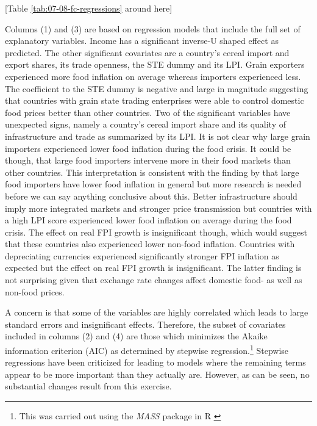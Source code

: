 \documentclass[12pt,english]{article}
\begin{document}
\begin{center}
[Table \ref{tab:07-08-fc-regressions} around here]
\par\end{center}

Columns (1) and (3) are based on regression models that include the full set of explanatory variables. Income has a significant inverse-U shaped effect as predicted. The other significant covariates are a country's cereal import and export shares, its trade openness, the STE dummy and its LPI. Grain exporters experienced more food inflation on average whereas importers experienced less. The coefficient to the STE dummy is negative and large in magnitude suggesting that countries with grain state trading enterprises were able to control domestic food prices better than other countries. Two of the significant variables have unexpected signs, namely a country's cereal import share and its quality of infrastructure and trade as summarized by its LPI. It is not clear why large grain importers experienced lower food inflation during the food crisis. It could be though, that large food importers intervene more in their food markets than other countries. This interpretation is consistent with the finding by \citet{Lee2013} that large food importers have lower food inflation in general but more research is needed before we can say anything conclusive about this. Better infrastructure should imply more integrated markets and stronger price transmission but countries with a high LPI score experienced lower food inflation on average during the food crisis. The effect on real FPI growth is insignificant though, which would suggest that these countries also experienced lower non-food inflation. Countries with depreciating currencies experienced significantly stronger FPI inflation as expected but the effect on real FPI growth is insignificant. The latter finding is not surprising given that exchange rate changes affect domestic food- as well as non-food prices.

A concern is that some of the variables are highly correlated which leads to large standard errors and insignificant effects. Therefore, the subset of covariates included in columns (2) and (4) are those which minimizes the Akaike information criterion (AIC) as determined by stepwise regression.\footnote{This was carried out using the \emph{MASS} package in \textsf{R} \citep{venables02}} Stepwise regressions have been criticized for leading to models where the remaining terms appear to be more important than they actually are. However, as can be seen, no substantial changes result from this exercise. 
\end{document}
